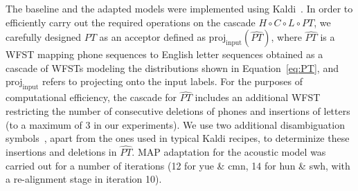 The baseline and the adapted models were implemented using Kaldi~\cite{Kaldi2011}. In order to efficiently carry out the required operations on the cascade $H \circ C \circ L \circ PT$, we carefully designed $PT$ as an acceptor defined as $\mathrm{proj}_{\mathrm{input}} (\widehat{PT})$, where $\widehat{PT}$ is a WFST mapping phone sequences to English letter sequences obtained as a cascade of WFSTs modeling the distributions shown in Equation~\ref{eq:PT}, and $\mathrm{proj}_{\mathrm{input}}$ refers to projecting onto the input labels. For the purposes of computational efficiency, the cascade for $\widehat{PT}$ includes an additional WFST restricting the number of consecutive deletions of phones and insertions of letters (to a maximum of 3 in our experiments). We use two additional disambiguation symbols~\cite{mohri2008speech}, apart from the ones used in typical Kaldi recipes, to determinize these insertions and deletions in $\widehat{PT}$. MAP adaptation for the acoustic model was carried out for a number of iterations (12 for yue \& cmn, 14 for hun \& swh, with a re-alignment stage in iteration 10).
